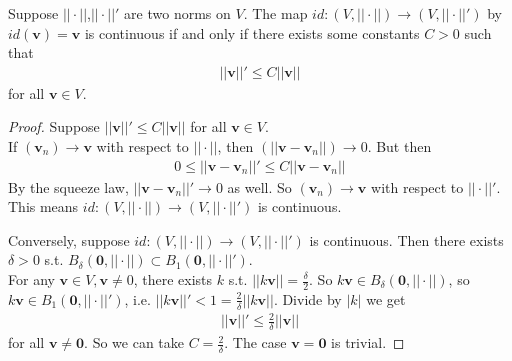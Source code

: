 \documentclass[a4paper]{article}
\begin{document}
\begin{prop}
Suppose $||\cdot||$,$||\cdot||'$ are two norms on $V$. The map $id: \left(V,||\cdot||\right) \to \left(V,||\cdot||'\right)$ by $id\left(\mathbf{v}\right) = \mathbf{v}$ is continuous if and only if there exists some constants $C>0$ such that
\begin{equation*}
\begin{aligned}
||\mathbf{v}||' \leq C ||\mathbf{v}||
\end{aligned}
\end{equation*}
for all $\mathbf{v} \in V$.
\begin{proof}
Suppose $||\mathbf{v}||' \leq C ||\mathbf{v}||$ for all $\mathbf{v} \in V$.\\
If $\left(\mathbf{v}_n\right) \to \mathbf{v}$ with respect to $||\cdot||$, then $\left(||\mathbf{v}-\mathbf{v}_n||\right) \to 0$. But then
\begin{equation*}
\begin{aligned}
0 \leq ||\mathbf{v} - \mathbf{v}_n||' \leq C ||\mathbf{v} - \mathbf{v}_n||
\end{aligned}
\end{equation*}
By the squeeze law, $||\mathbf{v}-\mathbf{v}_n||' \to 0$ as well. So $\left(\mathbf{v}_n\right) \to \mathbf{v}$ with respect to $||\cdot||'$. This means $id:\left(V,||\cdot||\right) \to \left(V,||\cdot||'\right)$ is continuous.

Conversely, suppose $id:\left(V,||\cdot||\right) \to \left(V,||\cdot||'\right)$ is continuous. Then there exists $\delta > 0$ s.t. $B_\delta\left(\mathbf{0},||\cdot||\right) \subset B_1\left(\mathbf{0},||\cdot||'\right)$.\\
For any $\mathbf{v} \in V, \mathbf{v} \neq 0$, there exists $k$ s.t. $||k\mathbf{v}|| = \frac{\delta}{2}$. So $k\mathbf{v} \in B_\delta \left(\mathbf{0},||\cdot||\right)$, so $k\mathbf{v} \in B_1\left(\mathbf{0},||\cdot||'\right)$, i.e. $||k\mathbf{v}||' < 1 = \frac{2}{\delta} ||k\mathbf{v}||$. Divide by $|k|$ we get
\begin{equation*}
\begin{aligned}
||\mathbf{v}||' \leq \frac{2}{\delta}||\mathbf{v}||
\end{aligned}
\end{equation*}
for all $\mathbf{v} \neq \mathbf{0}$. So we can take $C = \frac{2}{\delta}$. The case $\mathbf{v} = \mathbf{0}$ is trivial.
\end{proof}
\end{prop}
\end{document}
